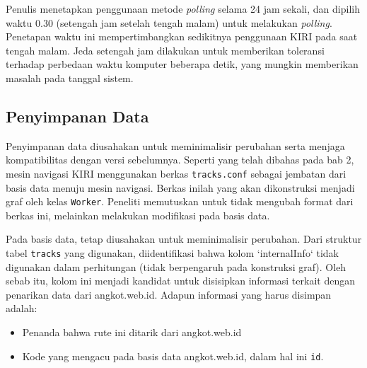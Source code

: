 Penulis menetapkan penggunaan metode \textit{polling} selama 24 jam sekali, dan dipilih waktu 0.30 (setengah jam setelah tengah malam) untuk melakukan \textit{polling}. Penetapan waktu ini mempertimbangkan sedikitnya penggunaan KIRI pada saat tengah malam. Jeda setengah jam dilakukan untuk memberikan toleransi terhadap perbedaan waktu komputer beberapa detik, yang mungkin memberikan masalah pada tanggal sistem. 

\subsection{Penyimpanan Data}

Penyimpanan data diusahakan untuk meminimalisir perubahan serta menjaga kompatibilitas dengan versi sebelumnya. Seperti yang telah dibahas pada bab 2, mesin navigasi KIRI menggunakan berkas \texttt{tracks.conf} sebagai jembatan dari basis data menuju mesin navigasi. Berkas inilah yang akan dikonstruksi menjadi graf oleh kelas \texttt{Worker}. Peneliti memutuskan untuk tidak mengubah format dari berkas ini, melainkan melakukan modifikasi pada basis data.

Pada basis data, tetap diusahakan untuk meminimalisir perubahan. Dari struktur tabel \texttt{tracks} yang digunakan, diidentifikasi bahwa kolom `internalInfo` tidak digunakan dalam perhitungan (tidak berpengaruh pada konstruksi graf). Oleh sebab itu, kolom ini menjadi kandidat untuk disisipkan informasi terkait dengan penarikan data dari angkot.web.id. Adapun informasi yang harus disimpan adalah:

\begin{itemize}
	\item Penanda bahwa rute ini ditarik dari angkot.web.id
	\item Kode yang mengacu pada basis data angkot.web.id, dalam hal ini \texttt{id}.
\end{itemize}


